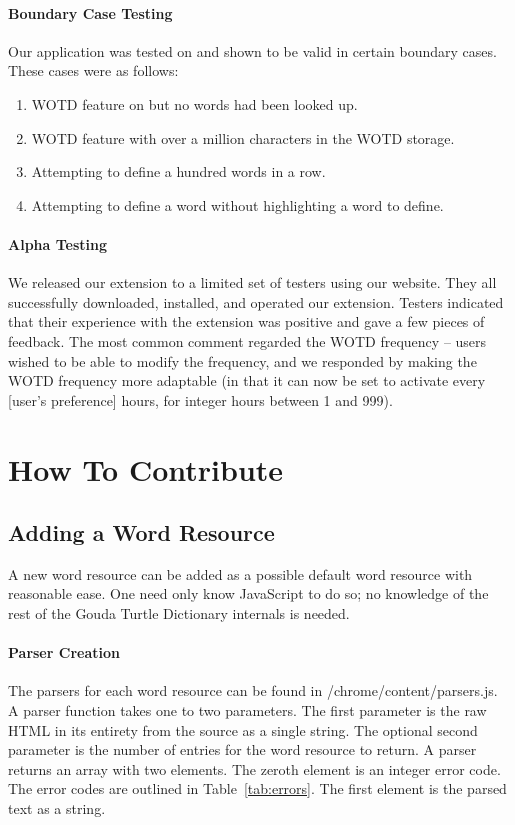 \documentclass{article}
\begin{document}
\paragraph{Boundary Case Testing}
Our application was tested on and shown to be valid in certain boundary cases.
These cases were as follows:
\begin{enumerate}
\item WOTD feature on but no words had been looked up.
\item WOTD feature with over a million characters in the WOTD storage.
\item Attempting to define a hundred words in a row.
\item Attempting to define a word without highlighting a word to define.
\end{enumerate}

\paragraph{Alpha Testing}
We released our extension to a limited set of testers using our
website. They all successfully downloaded, installed, and operated
our extension. Testers indicated that their experience with the extension
was positive and gave a few pieces of feedback. The most common comment
regarded the WOTD frequency -- users wished to be able to modify the frequency,
and we responded by making the WOTD frequency more adaptable (in that
it can now be set to activate every [user's preference] hours, for integer
hours between 1 and 999).

\section{How To Contribute}

\subsection{Adding a Word Resource}

A new word resource can be added as a possible default word resource
with reasonable ease. One need only know JavaScript to do
so; no knowledge of the rest of the Gouda Turtle Dictionary internals
is needed.

\paragraph{Parser Creation}
The parsers for each word resource can be found in /chrome/content/parsers.js.
A parser function takes one to two parameters. The first parameter is the
raw HTML in its entirety from the source as a single string. The optional
second parameter is the number of entries for the word resource to return.
A parser returns an array with two elements. The zeroth element is an integer
error code. The error codes are outlined in Table~\ref{tab:errors}. The first
element is the parsed text as a string.
\end{document}
